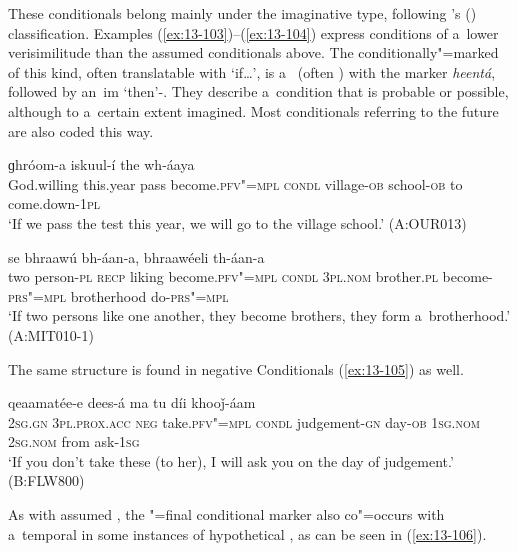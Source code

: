  These conditionals belong mainly under the imaginative type, following \citeauthor{thompsonetal2007}'s (\citeyear[259--260]{thompsonetal2007}) classification. Examples (\ref{ex:13-103})--(\ref{ex:13-104}) express conditions of a~lower verisimilitude than the assumed conditionals above. The conditionally"=marked  of this kind, often translatable with `if{\ldots}', is a~ (often )  with the  marker \textit{heentá}, followed by an~im `then'-. They describe a~condition that is probable or possible, although to a~certain extent imagined. Most conditionals referring to the future are also coded this way.

\begin{exe}
\ex
\label{ex:13-103}
  ɡhróom-a iskuul-í the wh-áaya \\
 God.willing this.year  pass become.\textsc{pfv"=mpl} \textsc{condl}  village-\textsc{ob} school-\textsc{ob} to come.down-\textsc{1pl} \\
\glt `If we pass the test this year, we will go to the village school.' (A:OUR013)

\ex
\label{ex:13-104}
 se bhraawú bh-áan-a,
bhraawéeli  th-áan-a \\
two person-\textsc{pl} \textsc{recp} liking become.\textsc{pfv"=mpl}  \textsc{condl } \textsc{3pl.nom} brother.\textsc{pl} become-\textsc{prs"=mpl} brotherhood do-\textsc{prs"=mpl} \\
\glt `If two persons like one another, they become brothers, they form a~brotherhood.' (A:MIT010-1) 
\end{exe}

The same structure is found in negative Conditionals (\ref{ex:13-105}) as well.

\begin{exe}
\ex
\label{ex:13-105}
  qeaamatée-e dees-á ma tu díi khooǰ-áam \\
\textsc{2sg.gn} \textsc{3pl.prox.acc} \textsc{neg} take.\textsc{pfv"=mpl} \textsc{condl} judgement-\textsc{gn} day-\textsc{ob} \textsc{1sg.nom} \textsc{2sg.nom} from ask-\textsc{1sg}  \\
\glt `If you don't take these (to her), I will ask you on the day of judgement.' (B:FLW800) 
\end{exe}

As with assumed , the "=final conditional marker also co"=occurs with a~temporal  in some instances of hypothetical , as can be seen in (\ref{ex:13-106}). 

